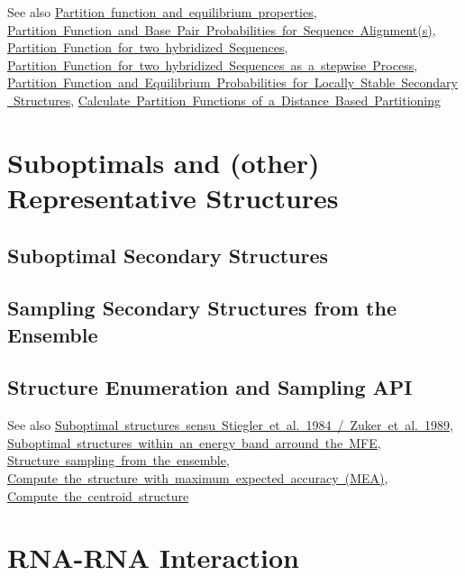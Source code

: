 \begin{DoxySeeAlso}{See also}
\mbox{\hyperlink{group__pf__fold}{Partition function and equilibrium properties}}, \mbox{\hyperlink{group__consensus__pf__fold}{Partition Function and Base Pair Probabilities for Sequence Alignment(s)}}, \mbox{\hyperlink{group__pf__cofold}{Partition Function for two hybridized Sequences}}, \mbox{\hyperlink{group__up__cofold}{Partition Function for two hybridized Sequences as a stepwise Process}}, \mbox{\hyperlink{group__local__pf__fold}{Partition Function and Equilibrium Probabilities for Locally Stable Secondary Structures}}, \mbox{\hyperlink{group__kl__neighborhood__pf}{Calculate Partition Functions of a Distance Based Partitioning}}
\end{DoxySeeAlso}
 \hypertarget{suboptimal_structures}{}\section{Suboptimals and (other) Representative Structures}\label{suboptimal_structures}
\hypertarget{suboptimal_structures_sec_suboptimals}{}\subsection{Suboptimal Secondary Structures}\label{suboptimal_structures_sec_suboptimals}
\hypertarget{suboptimal_structures_sec_samples}{}\subsection{Sampling Secondary Structures from the Ensemble}\label{suboptimal_structures_sec_samples}
\hypertarget{suboptimal_structures_sec_suboptimals_api}{}\subsection{Structure Enumeration and Sampling A\+PI}\label{suboptimal_structures_sec_suboptimals_api}
\begin{DoxySeeAlso}{See also}
\mbox{\hyperlink{group__subopt__zuker}{Suboptimal structures sensu Stiegler et al. 1984 / Zuker et al. 1989}}, \mbox{\hyperlink{group__subopt__wuchty}{Suboptimal structures within an energy band arround the M\+FE}}, \mbox{\hyperlink{group__subopt__stochbt}{Structure sampling from the ensemble}}, \mbox{\hyperlink{group__mea__fold}{Compute the structure with maximum expected accuracy (M\+EA)}}, \mbox{\hyperlink{group__centroid__fold}{Compute the centroid structure}}
\end{DoxySeeAlso}
 \hypertarget{rip}{}\section{R\+N\+A-\/\+R\+NA Interaction}\label{rip}
